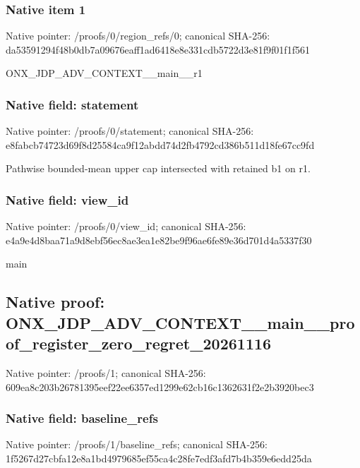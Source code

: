 \documentclass[10pt,a4paper]{article}
\begin{document}
\subsubsection{Native item 1}
Native pointer: /proofs/0/region\_\allowbreak{}refs/0; canonical SHA-256: da53591294f48b0db7a09676eaff1ad6418e8e331cdb5722d3e81f9f01f1f561

\begingroup\raggedright\sloppy ONX\_\allowbreak{}JDP\_\allowbreak{}ADV\_\allowbreak{}CONTEXT\_\allowbreak{}\_\allowbreak{}main\_\allowbreak{}\_\allowbreak{}r1\par\endgroup

\subsubsection{Native field: statement}
Native pointer: /proofs/0/statement; canonical SHA-256: e8fabcb74723d69f8d25584ca9f12abdd74d2fb4792cd386b511d18fe67cc9fd

\begingroup\raggedright\sloppy Pathwise bounded-mean upper cap intersected with retained b1 on r1.\par\endgroup

\subsubsection{Native field: view\_\allowbreak{}id}
Native pointer: /proofs/0/view\_\allowbreak{}id; canonical SHA-256: e4a9e4d8baa71a9d8ebf56ec8ae3ea1e82be9f96ae6fe89e36d701d4a5337f30

\begingroup\raggedright\sloppy main\par\endgroup

\subsection{Native proof: ONX\_\allowbreak{}JDP\_\allowbreak{}ADV\_\allowbreak{}CONTEXT\_\allowbreak{}\_\allowbreak{}main\_\allowbreak{}\_\allowbreak{}proof\_\allowbreak{}register\_\allowbreak{}zero\_\allowbreak{}regret\_\allowbreak{}20261116}
Native pointer: /proofs/1; canonical SHA-256: 609ea8c203b26781395eef22ee6357ed1299e62cb16c1362631f2e2b3920bec3

\subsubsection{Native field: baseline\_\allowbreak{}refs}
Native pointer: /proofs/1/baseline\_\allowbreak{}refs; canonical SHA-256: 1f5267d27cbfa12e8a1bd4979685ef55ca4c28fe7edf3afd7b4b359e6edd25da
\end{document}

